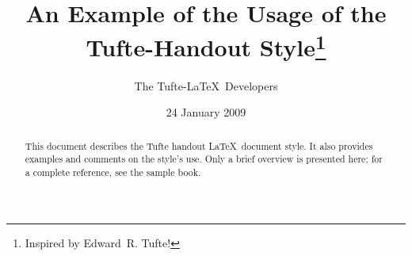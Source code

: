 \documentclass{tufte-handout}
\title{An Example of the Usage of the Tufte-Handout Style\thanks{Inspired by Edward~R. Tufte!}}
\author[The Tufte-LaTeX Developers]{The Tufte-\LaTeX\ Developers}
\date{24 January 2009}  %
\begin{document}
\maketitle%

\begin{abstract}
\noindent This document describes the Tufte handout \LaTeX\ document style.
It also provides examples and comments on the style's use.  Only a brief
overview is presented here; for a complete reference, see the sample book.
\end{abstract}

\end{document}
